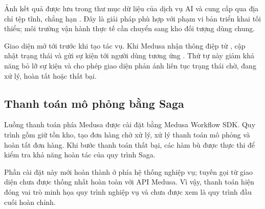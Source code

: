 \medskip

Ảnh kết quả được lưu trong thư mục dữ liệu của dịch vụ AI và cung cấp qua địa chỉ tệp tĩnh, chẳng hạn . Đây là giải pháp phù hợp với phạm vi bản triển khai tối thiểu; môi trường vận hành thực tế cần chuyển sang kho đối tượng dùng chung.

\medskip

Giao diện mở  tới  trước khi tạo tác vụ. Khi Medusa nhận thông điệp từ ,  cập nhật trạng thái và  gửi sự kiện  tới người dùng tương ứng \cite{sse-mdn}. Thứ tự này giảm khả năng bỏ lỡ sự kiện và cho phép giao diện phản ánh liên tục trạng thái chờ, đang xử lý, hoàn tất hoặc thất bại.

\subsection{Thanh toán mô phỏng bằng Saga}

Luồng thanh toán phía Medusa được cài đặt bằng Medusa Workflow SDK. Quy trình gồm giữ tồn kho, tạo đơn hàng chờ xử lý, xử lý thanh toán mô phỏng và hoàn tất đơn hàng. Khi bước thanh toán thất bại, các hàm bù được thực thi để kiểm tra khả năng hoàn tác của quy trình Saga.

\medskip

Phần cài đặt này mới hoàn thành ở phía hệ thống nghiệp vụ; tuyến gọi từ giao diện chưa được thống nhất hoàn toàn với API Medusa. Vì vậy, thanh toán hiện đóng vai trò minh họa quy trình nghiệp vụ và chưa được xem là quy trình đầu cuối hoàn chỉnh.

\clearpage
